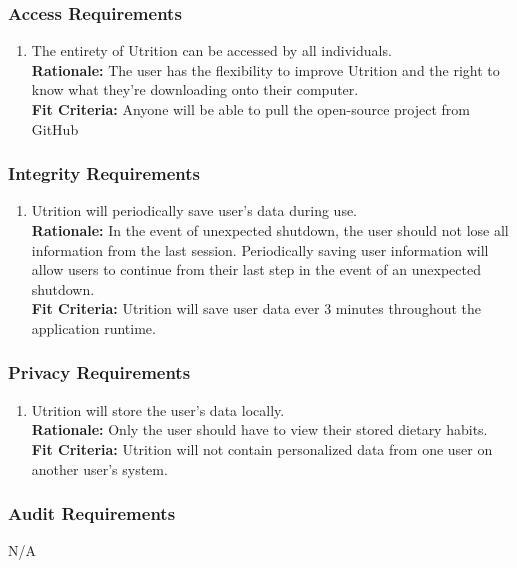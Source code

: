 \documentclass[12pt]{article}
\begin{document}
\subsubsection{Access Requirements}
\begin{enumerate}[{SR}1. ] 
	\item The entirety of Utrition can be accessed by all individuals. \\
	\textbf{Rationale:} The user has the flexibility to improve Utrition and the right to know what they’re downloading onto their computer.  \\	
	\textbf{Fit Criteria:} Anyone will be able to pull the open-source project from GitHub
\end{enumerate}

\subsubsection{Integrity Requirements}
\begin{enumerate}[{SR}2. ] 
	\item Utrition will periodically save user’s data during use. \\
\textbf{Rationale:} In the event of unexpected shutdown, the user should 
not lose all information from the last session. Periodically saving user 
information will allow users to continue from their last step in the event 
of an unexpected shutdown. \\	
	\textbf{Fit Criteria:} Utrition will save user data ever 3 minutes throughout the 
	application runtime.
\end{enumerate}

\subsubsection{Privacy Requirements}
\begin{enumerate}[{SR}3. ] 
	\item Utrition will store the user’s data locally.\\
	\textbf{Rationale:} Only the user should have to view their stored dietary habits. \\	
	\textbf{Fit Criteria:} Utrition will not contain personalized data from one user on another user's system.
\end{enumerate}

\subsubsection{Audit Requirements}
\hspace{1.5cm}N/A 
\end{document}
